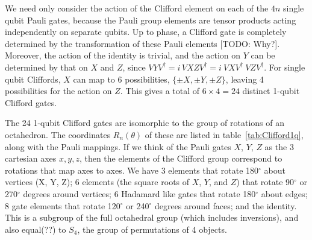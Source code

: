 We need only consider the action of the Clifford element on each of the $4n$ single qubit Pauli gates,  because the Pauli group elements are tensor products acting independently on separate qubits. Up to phase, a Clifford gate is completely determined by the transformation of these Pauli elements [TODO: Why?]. Moreover, the action of the identity is trivial, and the action on $Y$ can be determined by that on $X$ and $Z$, since $VYV^\dagger= i\, VXZV^\dagger = i\ VXV^\dagger\ VZV^\dagger$. For single qubit Cliffords, $X$ can map to 6 possibilities, $\{\pm X, \pm Y, \pm Z\}$,  leaving 4 possibilities for the action on $Z$. This gives a total of $6\times4=24$ distinct 1-qubit Clifford gates.

The 24 1-qubit Clifford gates are isomorphic to the group of rotations of an octahedron.  The coordinates $R_n(\theta)$ of these are listed in table~\ref{tab:Clifford1q}, along with the Pauli mappings.
 If we think of the Pauli gates $X$, $Y$, $Z$ as the 3 cartesian axes $x, y, z$, then the elements of the Clifford group correspond to rotations that map axes to axes. We have 3 elements that rotate 180$^{\circ}$ about vertices (X, Y, Z); 6 elements (the square roots of $X$, $Y$, and $Z$) that rotate 90$^{\circ}$ or 270$^{\circ}$ degrees around vertices; 6 Hadamard like gates that rotate 180$^{\circ}$ about edges;  8 gate elements that  rotate 120$^{\circ}$ or 240$^{\circ}$ degrees around faces; and the identity. This is a subgroup of the full octahedral group (which includes inversions), and also equal(??) to $S_4$, the group of permutations of 4 objects.
  

\begin{center}
 \end{center}


